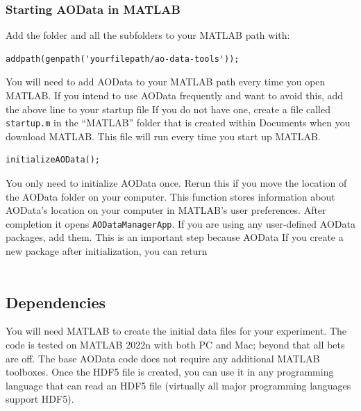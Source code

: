\documentclass[10pt]{exam}
\newcommand\myurl[1]{\textcolor{blue}{\underline{#1}}}
\newcommand\aodfcn[1]{\textcolor{darkteal}{\texttt{#1}}}
\begin{document}
        \subsubsection{Starting AOData in MATLAB}
		\noindent Add the folder and all the subfolders to your MATLAB path with:
		\begin{lstlisting}[style=matlab-editor, basicstyle=\mlttfamily\footnotesize]
addpath(genpath('yourfilepath/ao-data-tools'));
		\end{lstlisting} 
        You will need to add AOData to your MATLAB path every time you open MATLAB. If you intend to use AOData frequently and want to avoid this, add the above line to your startup file If you do not have one, create a file called \texttt{startup.m} in the ``MATLAB'' folder that is created within Documents when you download MATLAB. This file will run every time you start up MATLAB. 
        \begin{lstlisting}[style=matlab-editor, basicstyle=\mlttfamily\footnotesize]
initializeAOData();
        \end{lstlisting}
        You only need to initialize AOData once. Rerun this if you move the location of the AOData folder on your computer. This function stores information about AOData's location on your computer in MATLAB's user preferences. After completion it opens \aodfcn{AODataManagerApp}. If you are using any user-defined AOData packages, add them. This is an important step because AOData If you create a new package after initialization, you can return 
        \\$\quad$\\ 
	
	\subsection{Dependencies}
		\noindent You will need MATLAB to create the initial data files for your experiment. The code is tested on MATLAB 2022n with both PC and Mac; beyond that all bets are off. The base AOData code does not require any additional MATLAB toolboxes. Once the HDF5 file is created, you can use it in any programming language that can read an HDF5 file (virtually all major programming languages support HDF5). %
		
		
\end{document}
